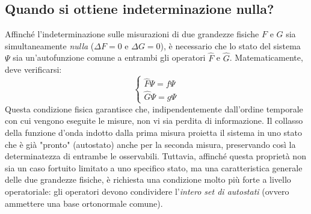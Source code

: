 \documentclass[a4paper,11pt]{report}
\begin{document}
\subsection{Quando si ottiene indeterminazione nulla?}
Affinché l'indeterminazione sulle misurazioni di due grandezze fisiche $F$ e $G$ sia simultaneamente \textit{nulla} ($\Delta F = 0$ e $\Delta G = 0$), è necessario che lo stato del sistema $\Psi$ sia un'autofunzione comune a entrambi gli operatori $\hat{F}$ e $\hat{G}$.
Matematicamente, deve verificarsi:
\begin{equation}
    \begin{cases}
        \hat{F}\Psi = f \Psi \\
        \hat{G}\Psi = g \Psi
    \end{cases}
\end{equation}
Questa condizione fisica garantisce che, indipendentemente dall'ordine temporale con cui vengono eseguite le misure, non vi sia perdita di informazione. Il collasso della funzione d'onda indotto dalla prima misura proietta il sistema in uno stato che è già "pronto" (autostato) anche per la seconda misura, preservando così la determinatezza di entrambe le osservabili.
Tuttavia, affinché questa proprietà non sia un caso fortuito limitato a uno specifico stato, ma una caratteristica generale delle due grandezze fisiche, è richiesta una condizione molto più forte a livello operatoriale: gli operatori devono condividere l'\textit{intero set di autostati} (ovvero ammettere una base ortonormale comune).
\end{document}
